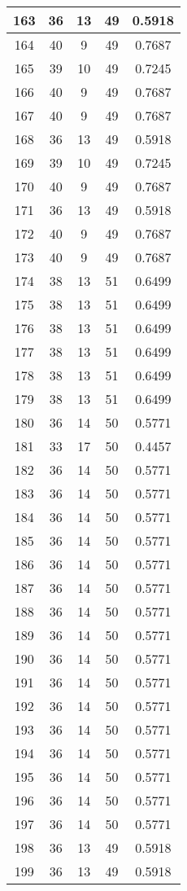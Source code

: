 \documentclass[letterpaper, 12pt]{article}
\begin{document}
\begin{longtable}{|c|c|c|c|c|}
\hline
163 & 36 & 13 & 49 & 0.5918 \\
\hline
164 & 40 & 9 & 49 & 0.7687 \\
\hline
165 & 39 & 10 & 49 & 0.7245 \\
\hline
166 & 40 & 9 & 49 & 0.7687 \\
\hline
167 & 40 & 9 & 49 & 0.7687 \\
\hline
168 & 36 & 13 & 49 & 0.5918 \\
\hline
169 & 39 & 10 & 49 & 0.7245 \\
\hline
170 & 40 & 9 & 49 & 0.7687 \\
\hline
171 & 36 & 13 & 49 & 0.5918 \\
\hline
172 & 40 & 9 & 49 & 0.7687 \\
\hline
173 & 40 & 9 & 49 & 0.7687 \\
\hline
174 & 38 & 13 & 51 & 0.6499 \\
\hline
175 & 38 & 13 & 51 & 0.6499 \\
\hline
176 & 38 & 13 & 51 & 0.6499 \\
\hline
177 & 38 & 13 & 51 & 0.6499 \\
\hline
178 & 38 & 13 & 51 & 0.6499 \\
\hline
179 & 38 & 13 & 51 & 0.6499 \\
\hline
180 & 36 & 14 & 50 & 0.5771 \\
\hline
181 & 33 & 17 & 50 & 0.4457 \\
\hline
182 & 36 & 14 & 50 & 0.5771 \\
\hline
183 & 36 & 14 & 50 & 0.5771 \\
\hline
184 & 36 & 14 & 50 & 0.5771 \\
\hline
185 & 36 & 14 & 50 & 0.5771 \\
\hline
186 & 36 & 14 & 50 & 0.5771 \\
\hline
187 & 36 & 14 & 50 & 0.5771 \\
\hline
188 & 36 & 14 & 50 & 0.5771 \\
\hline
189 & 36 & 14 & 50 & 0.5771 \\
\hline
190 & 36 & 14 & 50 & 0.5771 \\
\hline
191 & 36 & 14 & 50 & 0.5771 \\
\hline
192 & 36 & 14 & 50 & 0.5771 \\
\hline
193 & 36 & 14 & 50 & 0.5771 \\
\hline
194 & 36 & 14 & 50 & 0.5771 \\
\hline
195 & 36 & 14 & 50 & 0.5771 \\
\hline
196 & 36 & 14 & 50 & 0.5771 \\
\hline
197 & 36 & 14 & 50 & 0.5771 \\
\hline
198 & 36 & 13 & 49 & 0.5918 \\
\hline
199 & 36 & 13 & 49 & 0.5918 \\
\hline
\end{longtable}
\end{document}
